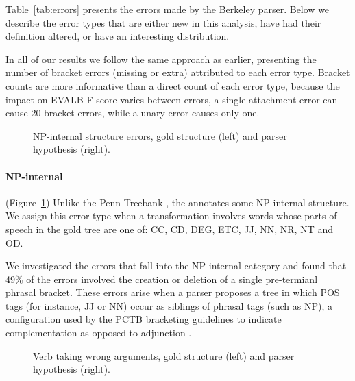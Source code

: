 Table~\ref{tab:errors} presents the errors made by the Berkeley parser.
Below we describe the error types that are either new in this analysis, have had their definition altered, or have an interesting distribution.

In all of our results we follow the same approach as earlier, presenting the number of bracket errors (missing or extra) attributed to each error type.
Bracket counts are more informative than a direct count of each error type, because the impact on EVALB F-score varies between errors, \myeg a single attachment error can cause 20 bracket errors, while a unary error causes only one.

\begin{figure}
\centering
  \caption{NP-internal structure errors, gold structure (left) and parser hypothesis (right).}\label{fig:np_internal}
\end{figure}

\paragraph{NP-internal} (Figure~\ref{fig:np_internal})
Unlike the Penn Treebank \parencite{Marcus-Santorini-Marcinkiewicz:1994:CL}, the \pctb annotates some NP-internal structure.
We assign this error type when a transformation involves words whose parts of speech in the gold tree are one of: CC, CD, DEG, ETC, JJ, NN, NR, NT and OD.

We investigated the errors that fall into the NP-internal category and found that 49\% of the errors involved the creation or deletion of a single pre-termianl phrasal bracket.
These errors arise when a parser proposes a tree in which POS tags (for instance, JJ or NN) occur as siblings of phrasal tags (such as NP), a configuration used by the PCTB bracketing guidelines to indicate complementation as opposed to adjunction \parencite{Xue:2005:NLE}.

\begin{figure}
\centering
  \caption{Verb taking wrong arguments, gold structure (left) and parser hypothesis (right).}\label{fig:wrong_arg}
\end{figure}

